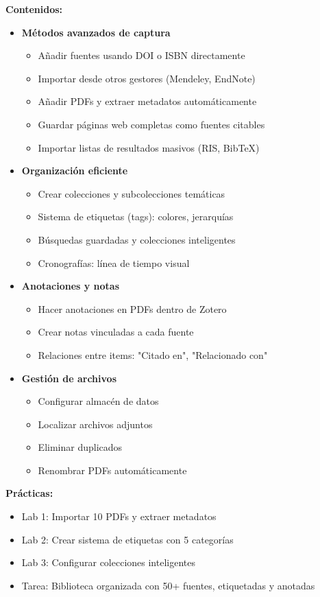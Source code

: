 \documentclass[12pt,a4paper]{yaac-luatex}
\begin{document}
\begin{tcolorbox}[
		enhanced,
		colback=white,
		colframe=curso2color,
		arc=3pt,
		boxrule=1.5pt,
		left=10pt,
		right=10pt,
		top=8pt,
		bottom=8pt,
		breakable
		]
		\textbf{Contenidos:}
		\begin{itemize}[leftmargin=*, itemsep=0.1cm]
			\item \textbf{Métodos avanzados de captura}
			\begin{itemize}
				\item Añadir fuentes usando DOI o ISBN directamente
				\item Importar desde otros gestores (Mendeley, EndNote)
				\item Añadir PDFs y extraer metadatos automáticamente
				\item Guardar páginas web completas como fuentes citables
				\item Importar listas de resultados masivos (RIS, BibTeX)
			\end{itemize}
			\item \textbf{Organización eficiente}
			\begin{itemize}
				\item Crear colecciones y subcolecciones temáticas
				\item Sistema de etiquetas (tags): colores, jerarquías
				\item Búsquedas guardadas y colecciones inteligentes
				\item Cronografías: línea de tiempo visual
			\end{itemize}
			\item \textbf{Anotaciones y notas}
			\begin{itemize}
				\item Hacer anotaciones en PDFs dentro de Zotero
				\item Crear notas vinculadas a cada fuente
				\item Relaciones entre items: "Citado en", "Relacionado con"
			\end{itemize}
			\item \textbf{Gestión de archivos}
			\begin{itemize}
				\item Configurar almacén de datos
				\item Localizar archivos adjuntos
				\item Eliminar duplicados
				\item Renombrar PDFs automáticamente
			\end{itemize}
		\end{itemize}
		
		\textbf{Prácticas:}
		\begin{itemize}[leftmargin=*, itemsep=0.1cm]
			\item Lab 1: Importar 10 PDFs y extraer metadatos
			\item Lab 2: Crear sistema de etiquetas con 5 categorías
			\item Lab 3: Configurar colecciones inteligentes
			\item Tarea: Biblioteca organizada con 50+ fuentes, etiquetadas y anotadas
		\end{itemize}
	\end{tcolorbox}
	
\end{document}
